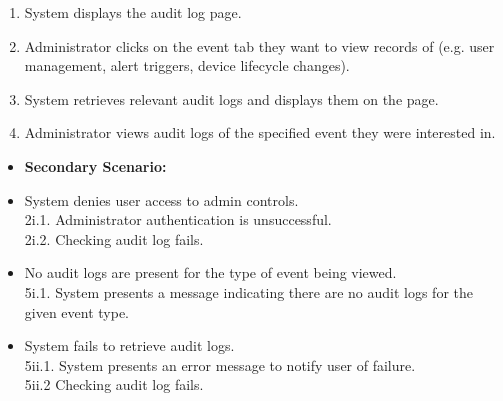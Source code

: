 \documentclass[]{article}
\begin{document}
\begin{enumerate}[{\bf BE1.}]
\begin{enumerate}[1.]
			\item System displays the audit log page.
			\item Administrator clicks on the event tab they want to view records of (e.g. user management, alert triggers, device lifecycle changes).
			\item System retrieves relevant audit logs and displays them on the page.
			\item Administrator views audit logs of the specified event they were interested in.
		\end{enumerate}
		\begin{itemize}
			\item[] {\bf Secondary Scenario:}
			\item[2i.] System denies user access to admin controls. \\
			\hspace{1cm}2i.1. Administrator authentication is unsuccessful. \\
			\hspace{1cm}2i.2. Checking audit log fails.
			\item[5i.] No audit logs are present for the type of event being viewed. \\
			\hspace{1cm}5i.1. System presents a message indicating there are no audit logs for the given event type.
			\item[5ii.] System fails to retrieve audit logs. \\
			\hspace{1cm}5ii.1. System presents an error message to notify user of failure. \\
			\hspace{1cm}5ii.2 Checking audit log fails.
		\end{itemize}


\end{enumerate}
\end{document}
